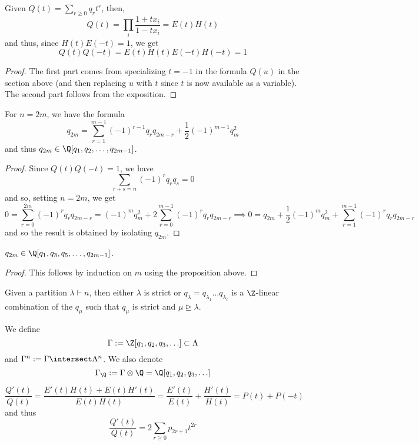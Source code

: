 \documentclass[11pt,leqno,oneside]{amsart}
\numberwithin{thm}{section}
\newcommand{\partitionof}{\vdash}
\newcommand{\sym}{\Lambda}
\newcommand{\dominates}{\mathrel{\unrhd}}
\begin{document}
\begin{cor}
  Given \(Q(t) = \sum_{r \geq 0} q_r t^r\), then, \[
    Q(t) = \prod_{i} \frac{1+t x_i}{1-t x_i} = E(t)H(t)
  \]
  and thus, since \(H(t)E(-t) = 1\), we get \[
    Q(t)Q(-t) = E(t)H(t)E(-t)H(-t) = 1
  \]
\end{cor}
\begin{proof}
  The first part comes from specializing \(t = -1\) in the formula
  \(Q(u)\) in the section above (and then replacing \(u\) with \(t\)
  since \(t\) is now available as a variable). The second part follows
  from the exposition. 
\end{proof}
\begin{prop}
  For \(n = 2m\), we have the formula \[
    q_{2m} = \sum_{r=1}^{m-1} (-1)^{r-1} q_r q_{2m-r} + \frac{1}{2}(-1)^{m-1}q_m^2
  \]
  and thus \(q_{2m} \in \Q[q_1, q_2, \ldots, q_{2m-1}]\).
\end{prop}
\begin{proof}
  Since \(Q(t)Q(-t)=1\), we have \[
    \sum_{r+s = n} (-1)^r q_r q_s = 0
  \]
  and so, setting \(n=2m\), we get \[
    0 = \sum_{r=0}^{2m} (-1)^r q_r q_{2m-r} = (-1)^m q_m^2 + 2 \sum_{r=0}^{m-1} (-1)^r
    q_r q_{2m-r}  \implies 0 = q_{2m} + \frac{1}{2}(-1)^m q_m^2 + \sum_{r=1}^{m-1} (-1)^r q_r q_{2m-r} 
  \]
  and so the result is obtained by isolating \(q_{2m}\).
\end{proof}
\begin{cor}
  \(q_{2m} \in \Q[q_1, q_3, q_5, \ldots, q_{2m-1}]\).
\end{cor}
\begin{proof}
  This follows by induction on \(m\) using the proposition above. 
\end{proof}
\begin{cor}\label{non-strict-sum-of-strict}
  Given a partition \(\lambda \partitionof n\), then either
  \(\lambda\) is strict or \(q_\lambda = q_{\lambda_1} \ldots
  q_{\lambda_\ell}\) is a \(\Z\)-linear combination of the \(q_\mu\)
  such that \(q_\mu\) is strict and \(\mu \dominates \lambda\).
\end{cor}
\begin{defn}
  We define \[
    \Gamma := \Z[q_1, q_2, q_3, \ldots] \subset \sym
  \]
  and \(\Gamma^n := \Gamma \intersect \sym^n\). We also denote \[
    \Gamma_\Q := \Gamma \otimes \Q = \Q[q_1, q_2, q_3, \ldots]
  \]
\end{defn}
\begin{lem}
  \[
    \frac{Q'(t)}{Q(t)} = \frac{E'(t)H(t)+E(t)H'(t)}{E(t)H(t)} =
    \frac{E'(t)}{E(t)} + \frac{H'(t)}{H(t)} = P(t) + P(-t)
  \]
  and thus \[
    \frac{Q'(t)}{Q(t)} = 2 \sum_{r \geq 0} p_{2r+1} t^{2r}
  \]
\end{lem}
\end{document}
